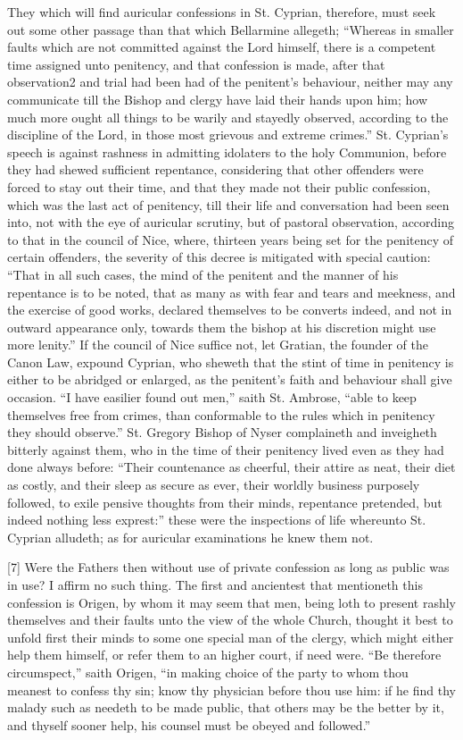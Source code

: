 They which will find auricular confessions in St. Cyprian, therefore, must seek out some other passage than that which Bellarmine allegeth; “Whereas in smaller faults which are not committed against the Lord himself, there is a competent time assigned unto penitency, and that confession is made, after that observation2 and trial had been had of the penitent’s behaviour, neither may any communicate till the Bishop and clergy have laid their hands upon him; how much more ought all things to be warily and stayedly observed, according to the discipline of the Lord, in those most grievous and extreme crimes.” St. Cyprian’s speech is against rashness in admitting idolaters to the holy Communion, before they had shewed sufficient repentance, considering that other offenders were forced to stay out their time, and that they made not their public confession, which was the last act of penitency, till their life and conversation had been seen into, not with the eye of auricular scrutiny, but of pastoral observation, according to that in the council of Nice, where, thirteen years being set for the penitency of certain offenders, the severity of this decree is mitigated with special caution: “That in all such cases, the mind of the penitent and the manner of his repentance is to be noted, that as many as with fear and tears and meekness, and the exercise of good works, declared themselves to be converts indeed, and not in outward appearance only, towards them the bishop at his discretion might use more lenity.” If the council of Nice suffice not, let Gratian, the founder of the Canon Law, expound Cyprian, who sheweth that the stint of time in penitency is either to be abridged or enlarged, as the penitent’s faith and behaviour shall give occasion. “I have easilier found out men,” saith St. Ambrose, “able to keep themselves free from crimes, than conformable to the rules which in penitency they should observe.” St. Gregory Bishop of Nyser complaineth and inveigheth bitterly against them, who in the time of their penitency lived even as they had done always before: “Their countenance as cheerful, their attire as neat, their diet as costly, and their sleep as secure as ever, their worldly business purposely followed, to exile pensive thoughts from their minds, repentance pretended, but indeed nothing less exprest:” these were the inspections of life whereunto St. Cyprian alludeth; as for auricular examinations he knew them not.

[7] Were the Fathers then without use of private confession as long as public was in use? I affirm no such thing.  The first and ancientest that mentioneth this confession is Origen, by whom it may seem that men, being loth to present rashly themselves and their faults unto the view of the whole Church, thought it best to unfold first their minds to some one special man of the clergy, which might either help them himself, or refer them to an higher court, if need were. “Be therefore circumspect,” saith Origen, “in making choice of the party to whom thou meanest to confess thy sin; know thy physician before thou use him: if he find thy malady such as needeth to be made public, that others may be the better by it, and thyself sooner help, his counsel must be obeyed and followed.”


